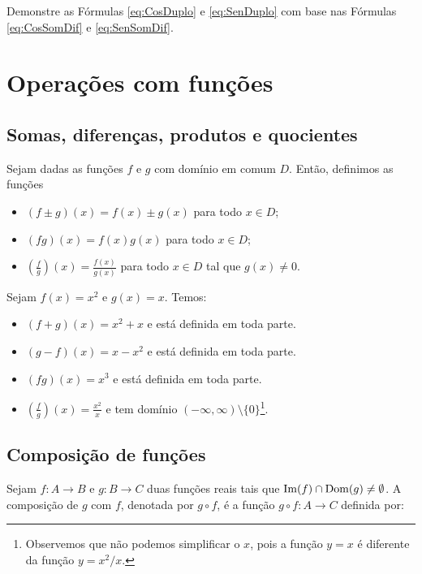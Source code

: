 \documentclass[../main.tex]{subfiles}
\begin{document}
\begin{exer}
  Demonstre as Fórmulas \ref{eq:CosDuplo} e \ref{eq:SenDuplo} com base nas Fórmulas \ref{eq:CosSomDif} e \ref{eq:SenSomDif}.
\end{exer}
\section{Operações com funções}\label{subsec:Func-Operacoes}
\subsection{Somas, diferenças, produtos e quocientes}
Sejam dadas as funções $f$ e $g$ com domínio em comum $D$. Então, definimos as funções
\begin{itemize}
\item $(f\pm g)(x) = f(x) \pm g(x)$ para todo $x\in D$;
\item $(fg)(x) = f(x)g(x)$ para todo $x\in D$;
\item $\displaystyle \left(\frac{f}{g}\right)(x) = \frac{f(x)}{g(x)}$ para todo $x\in D$ tal que $g(x)\neq 0$.
\end{itemize}

\begin{ex}
  Sejam $f(x)=x^2$ e $g(x)=x$. Temos:
  \begin{itemize}
  \item $(f+g)(x) = x^2 + x$ e está definida em toda parte.
  \item $(g-f)(x) = x - x^2$ e está definida em toda parte.
  \item $(fg)(x) = x^3$ e está definida em toda parte.
  \item $\left(\frac{f}{g}\right)(x) = \frac{x^2}{x}$ e tem domínio $(-\infty, \infty)\setminus \{0\}$\footnote{Observemos que não podemos simplificar o $x$, pois a função $y=x$ é diferente da função $y=x^2/x$.}.
  \end{itemize}
\end{ex}

\subsection{Composição de funções}\label{subsec:Composicao-Funcoes}
Sejam \(f:A\rightarrow B\) e \(g:B\rightarrow C\) duas funções reais tais que \({\rm Im}(f)\cap {\rm Dom}(g)\not=\emptyset\). A composição de \(g\) com \(f\), denotada por \(g\circ f\), é a função \(g\circ f : A\rightarrow C\) definida por:
\end{document}
